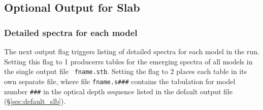 \documentclass[11pt]{article}
\begin{document}
\subsection{Optional Output for Slab}
\label{sec:optional_slb}

\subsubsection{Detailed spectra for each model }
\label{sec:detail_slb}

The next output flag triggers listing of detailed spectra for each
model in the run.  Setting this flag to 1 producerrs tables for the
emerging spectra of all models in the single output file {\tt
  fname.stb}.  Setting the flag to 2 places each table in its own
separate file, where file {\tt fname.s\#\#\#} contains the tabulation
for model number {\tt \#\#\#} in the optical depth sequence listed in
the default output file (\S\ref{sec:default_slb}).
\end{document}
